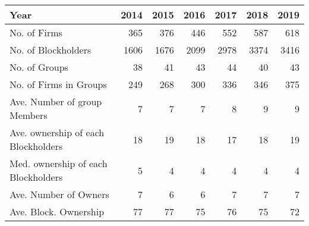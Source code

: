 \begin{tabular}{lrrrrrr}
\toprule
Year &  2014 &  2015 &  2016 &  2017 &  2018 &  2019 \\
\midrule
No. of Firms                        &   365 &   376 &   446 &   552 &   587 &   618 \\
No. of Blockholders                 &  1606 &  1676 &  2099 &  2978 &  3374 &  3416 \\
No. of Groups                       &    38 &    41 &    43 &    44 &    40 &    43 \\
No. of Firms in Groups              &   249 &   268 &   300 &   336 &   346 &   375 \\
Ave. Number of group Members        &     7 &     7 &     7 &     8 &     9 &     9 \\
Ave. ownership of each Blockholders &    18 &    19 &    18 &    17 &    18 &    19 \\
Med. ownership of each Blockholders &     5 &     4 &     4 &     4 &     4 &     4 \\
Ave. Number of Owners               &     7 &     6 &     6 &     7 &     7 &     7 \\
Ave. Block. Ownership               &    77 &    77 &    75 &    76 &    75 &    72 \\
\bottomrule
\end{tabular}

